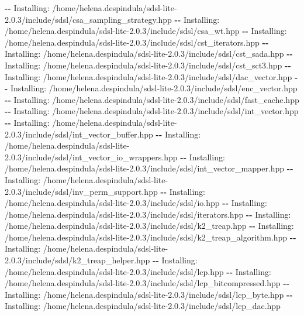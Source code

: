 \documentclass[
]{article}
\newenvironment{Shaded}{\begin{snugshade}}{\end{snugshade}}
\newcommand{\ExtensionTok}[1]{\textcolor[rgb]{0.00,0.60,1.00}{\textbf{#1}}}
\newcommand{\NormalTok}[1]{\textcolor[rgb]{0.81,0.81,0.76}{#1}}
\begin{document}
\begin{Shaded}
\begin{Highlighting}[]
\ExtensionTok{{-}{-}}\NormalTok{ Installing: /home/helena.despindula/sdsl{-}lite{-}2.0.3/include/sdsl/csa\_sampling\_strategy.hpp}
\ExtensionTok{{-}{-}}\NormalTok{ Installing: /home/helena.despindula/sdsl{-}lite{-}2.0.3/include/sdsl/csa\_wt.hpp}
\ExtensionTok{{-}{-}}\NormalTok{ Installing: /home/helena.despindula/sdsl{-}lite{-}2.0.3/include/sdsl/cst\_iterators.hpp}
\ExtensionTok{{-}{-}}\NormalTok{ Installing: /home/helena.despindula/sdsl{-}lite{-}2.0.3/include/sdsl/cst\_sada.hpp}
\ExtensionTok{{-}{-}}\NormalTok{ Installing: /home/helena.despindula/sdsl{-}lite{-}2.0.3/include/sdsl/cst\_sct3.hpp}
\ExtensionTok{{-}{-}}\NormalTok{ Installing: /home/helena.despindula/sdsl{-}lite{-}2.0.3/include/sdsl/dac\_vector.hpp}
\ExtensionTok{{-}{-}}\NormalTok{ Installing: /home/helena.despindula/sdsl{-}lite{-}2.0.3/include/sdsl/enc\_vector.hpp}
\ExtensionTok{{-}{-}}\NormalTok{ Installing: /home/helena.despindula/sdsl{-}lite{-}2.0.3/include/sdsl/fast\_cache.hpp}
\ExtensionTok{{-}{-}}\NormalTok{ Installing: /home/helena.despindula/sdsl{-}lite{-}2.0.3/include/sdsl/int\_vector.hpp}
\ExtensionTok{{-}{-}}\NormalTok{ Installing: /home/helena.despindula/sdsl{-}lite{-}2.0.3/include/sdsl/int\_vector\_buffer.hpp}
\ExtensionTok{{-}{-}}\NormalTok{ Installing: /home/helena.despindula/sdsl{-}lite{-}2.0.3/include/sdsl/int\_vector\_io\_wrappers.hpp}
\ExtensionTok{{-}{-}}\NormalTok{ Installing: /home/helena.despindula/sdsl{-}lite{-}2.0.3/include/sdsl/int\_vector\_mapper.hpp}
\ExtensionTok{{-}{-}}\NormalTok{ Installing: /home/helena.despindula/sdsl{-}lite{-}2.0.3/include/sdsl/inv\_perm\_support.hpp}
\ExtensionTok{{-}{-}}\NormalTok{ Installing: /home/helena.despindula/sdsl{-}lite{-}2.0.3/include/sdsl/io.hpp}
\ExtensionTok{{-}{-}}\NormalTok{ Installing: /home/helena.despindula/sdsl{-}lite{-}2.0.3/include/sdsl/iterators.hpp}
\ExtensionTok{{-}{-}}\NormalTok{ Installing: /home/helena.despindula/sdsl{-}lite{-}2.0.3/include/sdsl/k2\_treap.hpp}
\ExtensionTok{{-}{-}}\NormalTok{ Installing: /home/helena.despindula/sdsl{-}lite{-}2.0.3/include/sdsl/k2\_treap\_algorithm.hpp}
\ExtensionTok{{-}{-}}\NormalTok{ Installing: /home/helena.despindula/sdsl{-}lite{-}2.0.3/include/sdsl/k2\_treap\_helper.hpp}
\ExtensionTok{{-}{-}}\NormalTok{ Installing: /home/helena.despindula/sdsl{-}lite{-}2.0.3/include/sdsl/lcp.hpp}
\ExtensionTok{{-}{-}}\NormalTok{ Installing: /home/helena.despindula/sdsl{-}lite{-}2.0.3/include/sdsl/lcp\_bitcompressed.hpp}
\ExtensionTok{{-}{-}}\NormalTok{ Installing: /home/helena.despindula/sdsl{-}lite{-}2.0.3/include/sdsl/lcp\_byte.hpp}
\ExtensionTok{{-}{-}}\NormalTok{ Installing: /home/helena.despindula/sdsl{-}lite{-}2.0.3/include/sdsl/lcp\_dac.hpp}

\end{Highlighting}
\end{Shaded}
\end{document}
